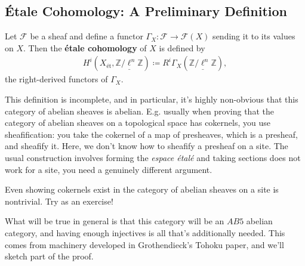 \hypertarget{uxe9tale-cohomology-a-preliminary-definition}{%
\subsection{Étale Cohomology: A Preliminary
Definition}\label{uxe9tale-cohomology-a-preliminary-definition}}

\begin{definition}

Let \(\mathcal{F}\) be a sheaf and define a functor
\(\Gamma_X: \mathcal{F}\to \mathcal{F}(X)\) sending it to its values on
\(X\). Then the \textbf{étale cohomology} of \(X\) is defined by
\begin{align*}  
H^i(X_\text{ét}, \underline{\mathbb{Z}/\ell^n\mathbb{Z}}) \coloneqq R^i \Gamma_X(\underline{\mathbb{Z}/\ell^n\mathbb{Z}})
,\end{align*}
the right-derived functors of \(\Gamma_X\).

\end{definition}

\begin{remark}

This definition is incomplete, and in particular, it's highly
non-obvious that this category of abelian sheaves is abelian. E.g.
usually when proving that the category of abelian sheaves on a
topological space has cokernels, you use sheafification: you take the
cokernel of a map of presheaves, which is a presheaf, and sheafify it.
Here, we don't know how to sheafify a presheaf on a site. The usual
construction involves forming the \emph{espace étalé} and taking
sections does not work for a site, you need a genuinely different
argument.

\end{remark}

\begin{warnings}

Even showing cokernels exist in the category of abelian sheaves on a
site is nontrivial. Try as an exercise!

\end{warnings}

\begin{remark}

What will be true in general is that this category will be an \(AB5\)
abelian category, and having enough injectives is all that's
additionally needed. This comes from machinery developed in
Grothendieck's Tohoku paper, and we'll sketch part of the proof.

\end{remark}

